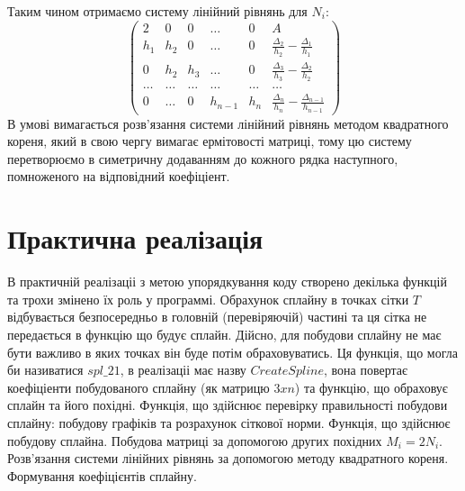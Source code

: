 \documentclass[titlepage]{article}
\newcommand\makelisting[1]{\begingroup\spacing{1} \vspace{1cm} \endgroup}
\newcommand\mysection[1]{\begingroup\center\section*{#1}\endgroup}
\begin{document}
Таким чином отримаємо систему лінійний рівнянь для $N_i$:
\[\left(\begin{array}{ccccc|c}
2 & 0 & 0 & \ldots & 0 & A\\
h_1 & h_2 & 0 & \ldots& 0  & \frac{\Delta_{2}}{h_{2}} - \frac{\Delta_1}{h_1}\\
0 & h_2 & h_3 & \ldots & 0 & \frac{\Delta_{3}}{h_{3}} - \frac{\Delta_2}{h_2}\\
\ldots &\ldots &\ldots &\ldots &\ldots & \ldots\\
0 & \ldots & 0  & h_{n-1} &h_n & \frac{\Delta_{n}}{h_{n}} - \frac{\Delta_{n-1}}{h_{n-1}}
\end{array}\right)\]
В умові вимагається розв'язання системи лінійний рівнянь методом квадратного кореня, який в свою чергу вимагає ермітовості матриці, тому цю систему перетворюємо в симетричну додаванням до кожного рядка наступного, помноженого на відповідний коефіціент.
\mysection{Практична реалізація}
В практичній реалізаціі з метою упорядкування коду створено декілька функцій та трохи змінено їх роль у программі. Обрахунок сплайну в точках сітки $T$ відбувається безпосередньо в головній (перевіряючій) частині та ця сітка не передається в функцію що будує сплайн. Дійсно, для побудови сплайну не має бути важливо в яких точках він буде потім обраховуватись. Ця функція, що могла би називатися $spl\_21$, в реалізаціі має назву $CreateSpline$, вона повертає коефіціенти побудованого сплайну (як матрицю $3xn$) та функцію, що обраховує сплайн та його похідні. 
Функція, що здійснює перевірку правильності побудови сплайну: побудову графіків та розрахунок сіткової норми.
\makelisting{main.m}
Функція, що здійснює побудову сплайна.
\makelisting{CreateSpline.m}
Побудова матриці за допомогою других похідних $M_i = 2N_i$.
\makelisting{CreateSEMatrix.m}
Розв'язання системи лінійних рівнянь за допомогою методу квадратного кореня.
\makelisting{SolveSE.m}
Формування коефіцієнтів сплайну.
\makelisting{FormSpline.m}
\end{document}
